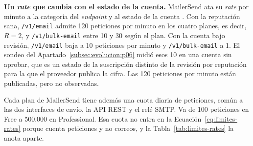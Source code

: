 \textbf{Un \textit{rate} que cambia con el estado de la cuenta.}
MailerSend ata su \textit{rate} por minuto a la categoría del \textit{endpoint} y al estado de la cuenta \citep{mailersenddocs}.
Con la reputación sana, \texttt{/v1/email} admite 120 peticiones por minuto en los cuatro planes, es decir, $R = 2$, y \texttt{/v1/bulk-email} entre 10 y 30 según el plan.
Con la cuenta bajo revisión, \texttt{/v1/email} baja a 10 peticiones por minuto y \texttt{/v1/bulk-email} a 1.
El sondeo del Apartado~\ref{subsec:evolucion:p06} midió esos 10 en una cuenta sin aprobar, que es un estado de la suscripción distinto de la revisión por reputación para la que el proveedor publica la cifra.
Las 120 peticiones por minuto están publicadas, pero no observadas.

Cada plan de MailerSend tiene además una cuota diaria de peticiones, común a las dos interfaces de envío, la API REST y el relé SMTP.
Va de 100 peticiones en Free a 500.000 en Professional.
Esa cuota no entra en la Ecuación~\eqref{eq:limites-rates} porque cuenta peticiones y no correos, y la Tabla~\ref{tab:limites-rates} la anota aparte.

